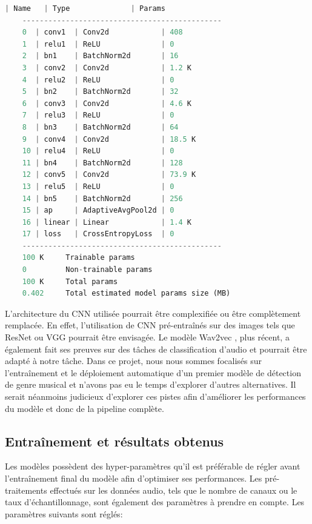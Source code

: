 \begin{lstlisting}[language=Python, caption=Architecture du CNN créé pour notre problème de classification, label=lst:cnn_architecture]
       | Name   | Type              | Params
    ----------------------------------------------
    0  | conv1  | Conv2d            | 408   
    1  | relu1  | ReLU              | 0     
    2  | bn1    | BatchNorm2d       | 16    
    3  | conv2  | Conv2d            | 1.2 K 
    4  | relu2  | ReLU              | 0     
    5  | bn2    | BatchNorm2d       | 32    
    6  | conv3  | Conv2d            | 4.6 K 
    7  | relu3  | ReLU              | 0     
    8  | bn3    | BatchNorm2d       | 64    
    9  | conv4  | Conv2d            | 18.5 K
    10 | relu4  | ReLU              | 0     
    11 | bn4    | BatchNorm2d       | 128   
    12 | conv5  | Conv2d            | 73.9 K
    13 | relu5  | ReLU              | 0     
    14 | bn5    | BatchNorm2d       | 256   
    15 | ap     | AdaptiveAvgPool2d | 0     
    16 | linear | Linear            | 1.4 K 
    17 | loss   | CrossEntropyLoss  | 0     
    ----------------------------------------------
    100 K     Trainable params
    0         Non-trainable params
    100 K     Total params
    0.402     Total estimated model params size (MB)
\end{lstlisting}

L'architecture du CNN utilisée pourrait être complexifiée ou être complètement remplacée. En effet, l'utilisation de CNN pré-entraînés sur des images tels que ResNet ou VGG pourrait être envisagée. Le modèle Wav2vec \cite{wav2vec}, plus récent, a également fait ses preuves sur des tâches de classification d'audio et pourrait être adapté à notre tâche. Dans ce projet, nous nous sommes focalisés sur l'entraînement et le déploiement automatique d'un premier modèle de détection de genre musical et n'avons pas eu le temps d'explorer d'autres alternatives. Il serait néanmoins judicieux d'explorer ces pistes afin d'améliorer les performances du modèle et donc de la pipeline complète.

\subsection{Entraînement et résultats obtenus}\label{subsec:training_results}

Les modèles possèdent des hyper-paramètres qu'il est préférable de régler avant l'entraînement final du modèle afin d'optimiser ses performances. Les pré-traitements effectués sur les données audio, tels que le nombre de canaux ou le taux d'échantillonnage, sont également des paramètres à prendre en compte. Les paramètres suivants sont réglés:

